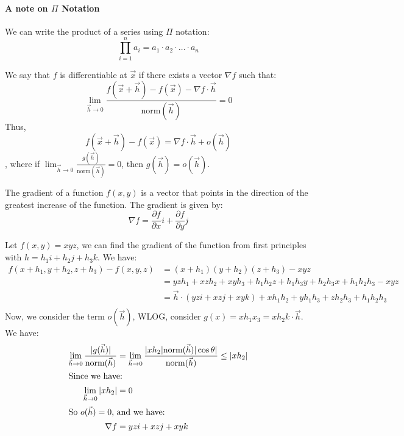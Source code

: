 \documentclass[11pt]{report}
\begin{document}
\paragraph{A note on $\Pi$ Notation} We can write the product of a series using $\Pi$ notation:
\begin{equation}
    \prod_{i=1}^n a_i = a_1 \cdot a_2 \cdot \ldots \cdot a_n
\end{equation}
\begin{definition}[Differentiability]
    We say that $f$ is differentiable at $\vec{x}$ if there exists a vector $\nabla f$ such that:
    \begin{equation}
        \lim_{\vec{h} \to 0} \frac{f(\vec{x} + \vec{h}) - f(\vec{x}) - \nabla f \cdot \vec{h}}{\text{norm}(\vec{h})} = 0
    \end{equation}
    Thus,
    \begin{equation}
        f(\vec{x} + \vec{h}) - f(\vec{x}) = \nabla f \cdot \vec{h} + o(\vec{h})
    \end{equation}
    , where if $\lim_{\vec{h} \to 0} \frac{g(\vec{h})}{\text{norm}(\vec{h})} = 0$, then $g(\vec{h}) = o(\vec{h})$.
\end{definition}
\begin{definition}[Gradient]
    The gradient of a function $f(x, y)$ is a vector that points in the direction of the greatest increase of the function. The gradient is given by:
    \begin{equation}
        \nabla f = \frac{\partial f}{\partial x}i + \frac{\partial f}{\partial y}j
    \end{equation}
\end{definition}
\begin{example}
    Let $f(x, y) = xyz$, we can find the gradient of the function from first principles with $h = h_1i + h_2j + h_3k$. We have:
    \begin{align*}
        f(x+h_1, y+h_2, z+h_3) - f(x, y, z) &= (x+h_1)(y+h_2)(z+h_3) - xyz \\
        &= yzh_1 + xzh_2 + xyh_3 + h_1h_2z + h_1h_3y + h_2h_3x + h_1h_2h_3 - xyz \\
        &= \vec{h} \cdot (yz i + xz j + xy k) + xh_1h_2 + yh_1h_3 + zh_2h_3 + h_1h_2h_3 \\
    \end{align*}
    Now, we consider the term $o(\vec{h})$, WLOG, consider $g(x) =xh_1x_3 = xh_2k\cdot \vec{h}$. We have:
    \begin{align*}
        \lim_{\vec{h} \to 0} \frac{|g(\vec{h})|}{\text{norm}(\vec{h})} &= \lim_{\vec{h} \to 0} \frac{|xh_2|\text{norm}(\vec{h})|\cos \theta|}{\text{norm}(\vec{h})} \le |xh_2| \\ 
        \intertext{Since we have:}
        \lim_{\vec{h} \to 0} |xh_2| &= 0\\
        \intertext{So $o(\vec{h}) = 0$, and we have:}
        \nabla f &= yz i + xz j + xy k
    \end{align*}
\end{example}
\end{document}
